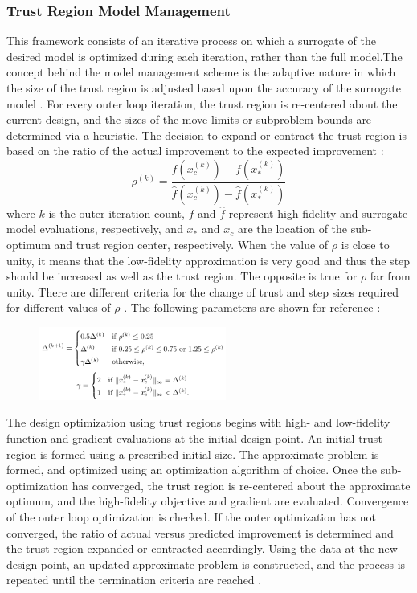 \subsubsection{Trust Region Model Management}
\label{subsubsec:TRMM}
This framework consists of an iterative process on which a surrogate of the desired model is optimized during each iteration, rather than the full model.The concept behind the model management scheme is the adaptive nature in which the size of the trust region is adjusted based upon the accuracy of the surrogate model \cite{fischer2018bayesian}. For every outer loop iteration, the trust region is re-centered about the current design, and the sizes of the move limits or subproblem bounds are determined via a heuristic. The decision to expand or contract the trust region is based on the ratio of the actual improvement to the expected improvement \cite{Bryson2019a}:
\begin{equation}
    \rho^{(k)}=\frac{f(x_c^{(k)})-f(x_{*}^{(k)})}{\hat{f}(x_c^{(k)})-\hat{f}(x_{*}^{(k)})} 
\end{equation}
where $k$ is the outer iteration count, $f$ and $\hat{f}$ represent high-fidelity and surrogate model evaluations, respectively, and $x_{*}$ and $x_c$ are the location of the sub-optimum and trust region center, respectively. When the value of $\rho$ is close to unity, it means that the low-fidelity approximation is very good and thus the step should be increased as well as the trust region. The opposite is true for $\rho$ far from unity. There are different criteria for the change of trust and step sizes required for different values of $\rho$ \cite{fischer2018bayesian, Bryson2019a}. The following parameters are shown for reference \cite{Bryson2019a}:  \par
\begin{figure}[h]
    \centering
    \includegraphics[width=0.55\textwidth]{images/TRMMcriteria.png}
\end{figure}
The design optimization using trust regions begins with high- and low-fidelity function and gradient
evaluations at the initial design point. An initial trust region is formed using a prescribed initial size.
The approximate problem is formed, and optimized using an optimization
algorithm of choice. Once the sub-optimization has converged, the trust region is re-centered about the
approximate optimum, and the high-fidelity objective and gradient are evaluated. Convergence of the outer
loop optimization is checked. If the outer optimization has not converged, the ratio of actual versus predicted
improvement is determined and the trust region expanded or contracted accordingly. Using the data at the
new design point, an updated approximate problem is constructed, and the process is repeated until the
termination criteria are reached \cite{Bryson2019a}.
